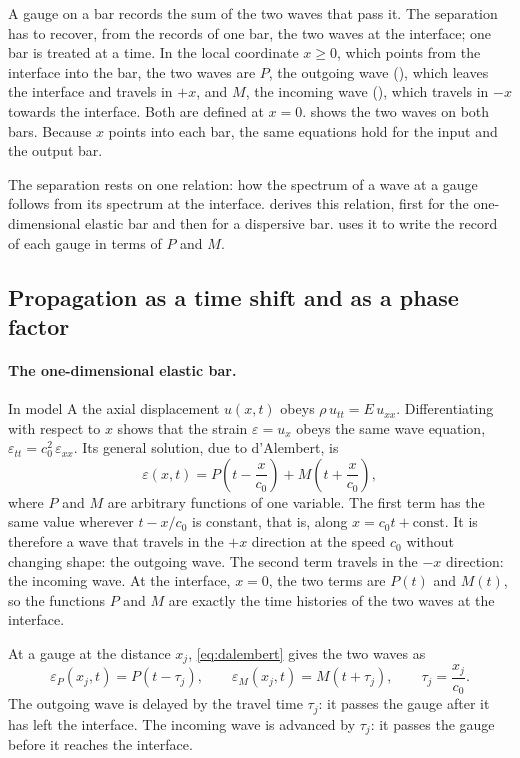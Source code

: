 \documentclass[11pt,a4paper,numbers=noenddot,abstract=true]{scrartcl}
\newcommand{\code}[1]{\texttt{\detokenize{#1}}}
\begin{document}
A gauge on a bar records the sum of the two waves that pass it. The separation has to recover, from the records of
one bar, the two waves at the interface; one bar is treated at a time. In the local coordinate $x \ge 0$, which
points from the interface into the bar, the two waves are $P$, the outgoing wave (\code{wave_out}), which leaves the
interface and travels in $+x$, and $M$, the incoming wave (\code{wave_in}), which travels in $-x$ towards the
interface. Both are defined at $x = 0$.  shows the two waves on both bars. Because $x$ points
into each bar, the same equations hold for the input and the output bar.

The separation rests on one relation: how the spectrum of a wave at a gauge follows from its spectrum at the
interface.  derives this relation, first for the one-dimensional elastic bar and then for a
dispersive bar.  uses it to write the record of each gauge in terms of $P$ and $M$.

\subsection{Propagation as a time shift and as a phase factor}
\label{sec:shift}

\paragraph{The one-dimensional elastic bar.} In model A the axial displacement $u(x, t)$ obeys
$\rho\, u_{tt} = E\, u_{xx}$. Differentiating with respect to $x$ shows that the strain $\varepsilon = u_x$ obeys
the same wave equation, $\varepsilon_{tt} = c_0^2\, \varepsilon_{xx}$. Its general solution, due to d'Alembert, is
\begin{equation}
  \varepsilon(x, t) = P\!\left(t - \frac{x}{c_0}\right) + M\!\left(t + \frac{x}{c_0}\right),
  \label{eq:dalembert}
\end{equation}
where $P$ and $M$ are arbitrary functions of one variable. The first term has the same value wherever
$t - x / c_0$ is constant, that is, along $x = c_0 t + \text{const}$. It is therefore a wave that travels in the
$+x$ direction at the speed $c_0$ without changing shape: the outgoing wave. The second term travels in the $-x$
direction: the incoming wave. At the interface, $x = 0$, the two terms are $P(t)$ and $M(t)$, so the functions
$P$ and $M$ are exactly the time histories of the two waves at the interface.

At a gauge at the distance $x_j$, \cref{eq:dalembert} gives the two waves as
\begin{equation}
  \varepsilon_P(x_j, t) = P(t - \tau_j), \qquad \varepsilon_M(x_j, t) = M(t + \tau_j), \qquad
  \tau_j = \frac{x_j}{c_0}.
\end{equation}
The outgoing wave is delayed by the travel time $\tau_j$: it passes the gauge after it has left the interface.
The incoming wave is advanced by $\tau_j$: it passes the gauge before it reaches the interface.
\end{document}

